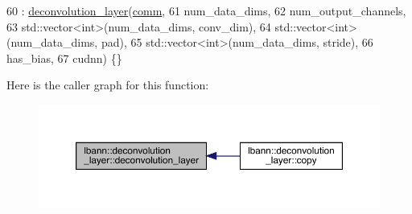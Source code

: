 \begin{DoxyCode}
60     : \hyperlink{classlbann_1_1deconvolution__layer_a95350e60a92634952c21b449ea14933d}{deconvolution\_layer}(\hyperlink{file__io_8cpp_ab048c6f9fcbcfaa57ce68b00263dbebe}{comm},
61                           num\_data\_dims,
62                           num\_output\_channels,
63                           std::vector<int>(num\_data\_dims, conv\_dim),
64                           std::vector<int>(num\_data\_dims, pad),
65                           std::vector<int>(num\_data\_dims, stride),
66                           has\_bias,
67                           cudnn) \{\}
\end{DoxyCode}
Here is the caller graph for this function\+:\nopagebreak
\begin{figure}[H]
\begin{center}
\leavevmode
\includegraphics[width=350pt]{classlbann_1_1deconvolution__layer_a95350e60a92634952c21b449ea14933d_icgraph}
\end{center}
\end{figure}
\mbox{\label{classlbann_1_1deconvolution__layer_a8d9e59dbf6b8d8506fd1e59e0bcd4439}} 
